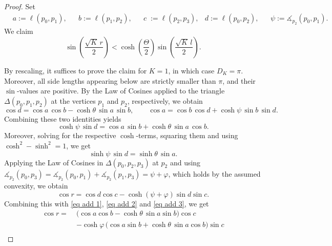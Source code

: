 \documentclass[10pt,a4paper]{amsart}
\DeclareMathOperator{\arcosh}{arcosh}
\newcommand{\ma}{\ensuremath{\measuredangle}}
\begin{document}
\begin{proof}
Set
\begin{equation*}
\begin{aligned}
&a:=\ell(p_0,p_1), &&b:=\ell(p_1,p_2), &&c\;:=\ell(p_2,p_3), 
&d:=\ell(p_0,p_2), &&\psi:=\ma_{p_2}(p_0,p_1).
\end{aligned}
\end{equation*}
We claim
\begin{equation*}
\sin\left(\frac{\sqrt K\,r}{2}\right)
< \cosh\left(\frac{\Theta}{2}\right)
\sin\left(\frac{\sqrt K\,l}{2}\right).
\end{equation*}

By rescaling, it suffices to prove the claim for $K=1$, in which case $D_K=\pi$.  
Moreover, all side lengths appearing below are strictly smaller than $\pi$, and their $\sin$-values are positive.
By the Law of Cosines applied to the triangle $\Delta(p_0,p_1,p_2)$ at the vertices $p_1$ and $p_2$, respectively, we obtain 
\begin{equation}\label{eq add 1}
\cos d =
\cos a\,\cos b-\cosh\theta\,\sin a\, \sin b,\qquad \cos a =
\cos b\,\cos d+\cosh\psi\,\sin b\, \sin d.
\end{equation}
Combining these two identities yields
\begin{equation}\label{eq add 2}
\cosh\psi\,\sin d
=
\cos a\,\sin b+\cosh\theta\,\sin a\,\cos b.
\end{equation}
Moreover, solving for the respective $\cosh$-terms, squaring them and using $\cosh^2-\sinh^2=1$, we get
\begin{equation}\label{eq add 3}
\sinh\psi\,\sin d
=
\sinh\theta\,\sin a.
\end{equation}
Applying the Law of Cosines in $\Delta(p_0,p_2,p_3)$ at $p_2$ and using $\ma_{p_2}(p_0,p_3) = \ma_{p_2}(p_0,p_1) + \ma_{p_2}(p_1,p_3) = \psi + \varphi$, which holds by the assumed convexity, we obtain
\begin{equation*}
\cos r
=
\cos d\cos c-\cosh(\psi+\varphi)\sin d\sin c.    
\end{equation*}
Combining this with \eqref{eq add 1}, \eqref{eq add 2} and \eqref{eq add 3}, we get
\begin{equation*}
\begin{aligned}
\cos r
=\;&
\bigl(\cos a\cos b-\cosh\theta\,\sin a\sin b\bigr)\cos c\\
&-\cosh\varphi\,
\bigl(\cos a\sin b+\cosh\theta\,\sin a\cos b\bigr)\sin c\\

\end{aligned}
\end{equation*}
\end{proof}
\end{document}
